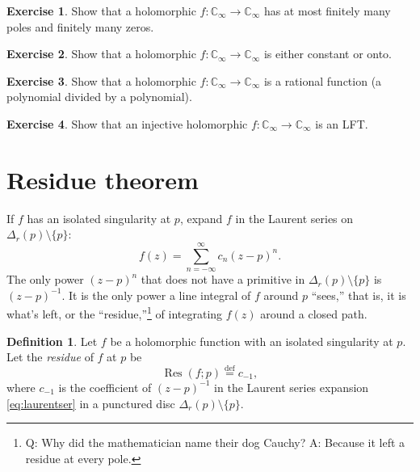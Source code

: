 \documentclass[12pt,openany]{book}
\newcommand{\glsadd}[2][]{}
\newcommand{\C}{{\mathbb{C}}}
\newcommand{\myindex}[1]{#1\index{#1}}
\newcommand{\myquote}[1]{``#1''}
\theoremstyle{plain}
\theoremstyle{remark}
\theoremstyle{definition}
\newtheorem{defn}[thm]{Definition}
\newenvironment{exbox}{%
    \def\FrameCommand{\vrule width 1pt \relax\hspace{10pt}}%
    \MakeFramed{\advance\hsize-\width\FrameRestore}%
}{%
    \endMakeFramed
}
\theoremstyle{exercise}
\newtheorem{exercise}{Exercise}[section]
\theoremstyle{example}
\begin{document}
\begin{exbox}
\begin{exercise}
Show that a holomorphic $f \colon \C_\infty \to \C_\infty$ has
at most finitely many poles and finitely many zeros.
\end{exercise}

\begin{exercise}
Show that a holomorphic $f \colon \C_\infty \to \C_\infty$ is
either constant or onto.
\end{exercise}

\begin{exercise}
Show that a holomorphic $f \colon \C_\infty \to \C_\infty$ is a
rational function (a polynomial divided by a polynomial).
\end{exercise}

\begin{exercise}
Show that an injective holomorphic $f \colon \C_\infty \to \C_\infty$ is an
LFT\@.
\end{exercise}
\end{exbox}


\section{Residue theorem}

If $f$ has an isolated singularity at $p$,
expand
$f$ in the Laurent series on $\Delta_r(p) \setminus \{ p \}$:
\begin{equation} \label{eq:laurentser}
f(z) = \sum_{n=-\infty}^\infty c_n {(z-p)}^n .
\end{equation}
The only power ${(z-p)}^n$ that does not have a primitive in
$\Delta_r(p) \setminus \{ p \}$ is ${(z-p)}^{-1}$.  It is the only power
a line integral of $f$ around $p$ \myquote{sees,} that is, it is
what's left, or the \myquote{residue,}\footnote{%
Q\@: Why did the mathematician name their dog Cauchy?
A\@: Because it left a residue at every pole.}
of integrating $f(z)$ around a closed path.

\begin{defn}
Let $f$ be a holomorphic function
with an isolated singularity at $p$.
Let the \emph{\myindex{residue}} of $f$ at $p$ be
\glsadd{not:Res}%
\begin{equation*}
\operatorname{Res}(f;p)
\overset{\text{def}}{=}
c_{-1} ,
\end{equation*}
where $c_{-1}$ is the coefficient of ${(z-p)}^{-1}$ in the Laurent series
expansion \eqref{eq:laurentser} in a punctured disc $\Delta_r(p) \setminus \{ p \}$.
\end{defn}
\end{document}
